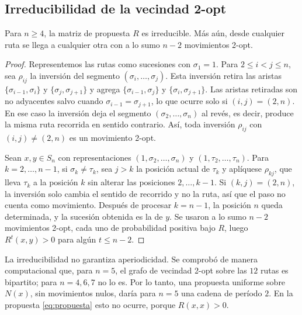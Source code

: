 \subsection{Irreducibilidad de la vecindad 2-opt}
\label{subsec:irreducibilidad}

\begin{proposicion}
\label{prop:irreducible}
Para \(n\ge 4\), la matriz de propuesta \(R\) es irreducible. Más aún,
desde cualquier ruta se llega a cualquier otra con a lo sumo \(n-2\)
movimientos 2-opt.
\end{proposicion}

\begin{proof}
Representemos las rutas como sucesiones con \(\sigma_1=1\). Para
\(2\le i<j\le n\), sea \(\rho_{ij}\) la inversión del segmento
\((\sigma_i,\ldots,\sigma_j)\). Esta inversión retira las aristas
\(\{\sigma_{i-1},\sigma_i\}\) y \(\{\sigma_j,\sigma_{j+1}\}\) y agrega
\(\{\sigma_{i-1},\sigma_j\}\) y \(\{\sigma_i,\sigma_{j+1}\}\). Las aristas
retiradas son no adyacentes salvo cuando \(\sigma_{i-1}=\sigma_{j+1}\),
lo que ocurre solo si \((i,j)=(2,n)\). En ese caso la inversión deja el
segmento \((\sigma_2,\ldots,\sigma_n)\) al revés, es decir, produce la
misma ruta recorrida en sentido contrario. Así, toda inversión
\(\rho_{ij}\) con \((i,j)\ne(2,n)\) es un movimiento 2-opt.

Sean \(x,y\in S_n\) con representaciones
\((1,\sigma_2,\ldots,\sigma_n)\) y \((1,\tau_2,\ldots,\tau_n)\). Para
\(k=2,\ldots,n-1\), si \(\sigma_k\ne\tau_k\), sea \(j>k\) la posición
actual de \(\tau_k\) y aplíquese \(\rho_{kj}\), que lleva \(\tau_k\) a
la posición \(k\) sin alterar las posiciones \(2,\ldots,k-1\). Si
\((k,j)=(2,n)\), la inversión solo cambia el sentido de recorrido y no
la ruta, así que el paso no cuenta como movimiento. Después de procesar
\(k=n-1\), la posición \(n\) queda determinada, y la sucesión obtenida
es la de \(y\). Se usaron a lo sumo \(n-2\) movimientos 2-opt, cada uno
de probabilidad positiva bajo \(R\), luego \(R^t(x,y)>0\) para algún
\(t\le n-2\).
\end{proof}

\begin{observacion}
\label{obs:bipartito}
La irreducibilidad no garantiza aperiodicidad. Se comprobó de manera
computacional que, para \(n=5\), el grafo de vecindad 2-opt sobre las
\(12\) rutas es bipartito; para \(n=4,6,7\) no lo es. Por lo tanto, una
propuesta uniforme sobre \(N(x)\), sin movimientos nulos, daría para
\(n=5\) una cadena de período \(2\). En la propuesta
\eqref{eq:propuesta} esto no ocurre, porque \(R(x,x)>0\).
\end{observacion}

